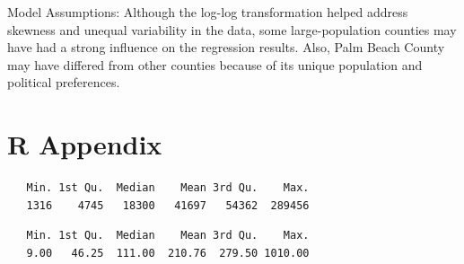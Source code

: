 \documentclass[
  letterpaper,
  DIV=11,
  numbers=noendperiod]{scrartcl}
\newenvironment{Shaded}{\begin{snugshade}}{\end{snugshade}}
\newcommand{\CommentTok}[1]{\textcolor[rgb]{0.37,0.37,0.37}{#1}}
\newcommand{\FunctionTok}[1]{\textcolor[rgb]{0.28,0.35,0.67}{#1}}
\newcommand{\NormalTok}[1]{\textcolor[rgb]{0.00,0.23,0.31}{#1}}
\newcommand{\OtherTok}[1]{\textcolor[rgb]{0.00,0.23,0.31}{#1}}
\newcommand{\SpecialCharTok}[1]{\textcolor[rgb]{0.37,0.37,0.37}{#1}}
\newcommand{\StringTok}[1]{\textcolor[rgb]{0.13,0.47,0.30}{#1}}
\begin{document}
Model Assumptions: Although the log-log transformation helped address
skewness and unequal variability in the data, some large-population
counties may have had a strong influence on the regression results.
Also, Palm Beach County may have differed from other counties because of
its unique population and political preferences.

\section{R Appendix}\label{r-appendix}

\begin{Shaded}
\end{Shaded}

\begin{verbatim}
   Min. 1st Qu.  Median    Mean 3rd Qu.    Max. 
   1316    4745   18300   41697   54362  289456 
\end{verbatim}

\begin{Shaded}
\end{Shaded}

\begin{verbatim}
   Min. 1st Qu.  Median    Mean 3rd Qu.    Max. 
   9.00   46.25  111.00  210.76  279.50 1010.00 
\end{verbatim}
\end{document}
